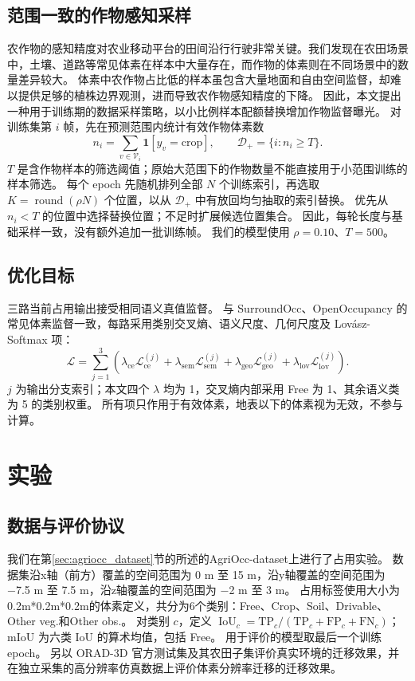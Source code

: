 \documentclass[a4paper,fleqn]{cas-sc}
\newcommand{\V}{\mathcal{V}}
\newcommand{\IoU}{\operatorname{IoU}}
\begin{document}
\subsection{范围一致的作物感知采样}\label{sec:cropsample}
农作物的感知精度对农业移动平台的田间沿行行驶非常关键。我们发现在农田场景中，土壤、道路等常见体素在样本中大量存在，而作物的体素则在不同场景中的数量差异较大。
体素中农作物占比低的样本虽包含大量地面和自由空间监督，却难以提供足够的植株边界观测，进而导致农作物感知精度的下降。
因此，本文提出一种用于训练期的数据采样策略，以小比例样本配额替换增加作物监督曝光。
对训练集第 $i$ 帧，先在预测范围内统计有效作物体素数
\begin{equation}
n_i=\sum_{v\in\V_i}\mathbf 1[y_v=\mathrm{crop}],\qquad
\mathcal D_+=\{i:n_i\ge T\}.
\end{equation}
$T$ 是含作物样本的筛选阈值；原始大范围下的作物数量不能直接用于小范围训练的样本筛选。
每个 epoch 先随机排列全部 $N$ 个训练索引，再选取 $K=\operatorname{round}(\rho N)$ 个位置，以从 $\mathcal D_+$ 中有放回均匀抽取的索引替换。
优先从 $n_i<T$ 的位置中选择替换位置；不足时扩展候选位置集合。
因此，每轮长度与基础采样一致，没有额外追加一批训练帧。
我们的模型使用 $\rho=0.10$、$T=500$。

\subsection{优化目标}\label{sec:loss}
三路当前占用输出接受相同语义真值监督。
与 SurroundOcc、OpenOccupancy 的常见体素监督一致\citep{wei2023surroundocc,wang2023openoccupancy}，每路采用类别交叉熵、语义尺度、几何尺度及 Lov\'{a}sz-Softmax 项：
\begin{equation}
\mathcal L=\sum_{j=1}^{3}\left(\lambda_{\mathrm{ce}}\mathcal L_{\mathrm{ce}}^{(j)}+
\lambda_{\mathrm{sem}}\mathcal L_{\mathrm{sem}}^{(j)}+
\lambda_{\mathrm{geo}}\mathcal L_{\mathrm{geo}}^{(j)}+
\lambda_{\mathrm{lov}}\mathcal L_{\mathrm{lov}}^{(j)}\right).
\end{equation}
$j$ 为输出分支索引；本文四个 $\lambda$ 均为 1，交叉熵内部采用 Free 为 1、其余语义类为 5 的类别权重。
所有项只作用于有效体素，地表以下的体素视为无效，不参与计算。
\section{实验}\label{sec:experiments}
\subsection{数据与评价协议}\label{sec:data}
我们在第\ref{sec:agriocc_dataset}节的所述的AgriOcc-dataset上进行了占用实验。
数据集沿x轴（前方）覆盖的空间范围为 0 m 至 15 m，沿y轴覆盖的空间范围为 −7.5 m 至 7.5 m，沿z轴覆盖的空间范围为 −2 m 至 3 m。
占用标签使用大小为0.2m*0.2m*0.2m的体素定义，共分为6个类别：Free、Crop、Soil、Drivable、Other veg.和Other obs.。
对类别 $c$，定义 $\IoU_c=\mathrm{TP}_c/(\mathrm{TP}_c+\mathrm{FP}_c+\mathrm{FN}_c)$；mIoU 为六类 IoU 的算术均值，包括 Free。
用于评价的模型取最后一个训练 epoch。
另以 ORAD-3D 官方测试集及其农田子集评价真实环境的迁移效果，并在独立采集的高分辨率仿真数据上评价体素分辨率迁移的迁移效果。
\end{document}
